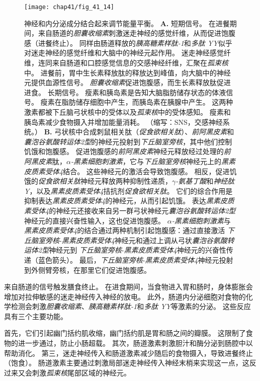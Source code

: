 \begin{figure}[htbp]
	\centering
	\texttt{[image: chap41/fig\_41\_14]}
	\caption{神经和内分泌成分结合起来调节能量平衡。 
		\textbf{A.} 短期信号。
		在进餐期间，来自肠道的\textit{胆囊收缩素}刺激迷走神经的感觉纤维，从而促进饱腹感（进餐终止）。
		同样由肠道释放的\textit{胰高糖素样肽-1}和\textit{多肽 YY}似乎对迷走神经的感觉纤维和大脑中的神经元起作用。
		迷走神经感觉纤维，连同来自肠道和口腔感觉信息的交感神经纤维，汇聚在\textit{孤束核}中。
		进餐前，胃中生长素释放肽的释放达到峰值，向大脑中的神经元提供血源性信号。
		\textit{胆囊收缩素}促进饱腹感，而生长素释放肽促进进食。
		长期信号。
		瘦素和胰岛素是告知大脑脂肪储存状态的体液信号。
		瘦素在脂肪储存细胞中产生，而胰岛素在胰腺中产生。
		这两种激素都被下丘脑弓状核中的受体以及\textit{孤束核}中的受体感知。
		瘦素和胰岛素减少食物摄入并增加能量消耗。
		（缩写：SNS，交感神经系统。）
		\textbf{B.} 弓状核中合成刺鼠相关肽（\textit{促食欲相关肽}）、\textit{前阿黑皮素}和\textit{囊泡谷氨酸转运体2型}的神经元投射到\textit{下丘脑室旁核}，其中他们控制饥饿和饱腹感。
		促进饱腹感的\textit{前阿黑皮素}神经元释放经过处理的\textit{前阿黑皮素}肽，\textit{$\alpha$-黑素细胞刺激素}，它与\textit{下丘脑室旁核}神经元上的\textit{黑素皮质素受体4}结合。
		这些神经元的激活会导致饱腹感。
		相反，促进饥饿的\textit{促食欲相关肽}神经元释放两种抑制性递质，\textit{$\gamma$-氨基丁酸}和\textit{神经肽Y}，以及\textit{黑素皮质素受体4}拮抗剂\textit{促食欲相关肽}。
		它们的综合作用是抑制表达\textit{黑素皮质素受体4}的神经元，从而引起饥饿。
		表达\textit{黑素皮质素受体4}的神经元还接收来自另一群弓状神经元\textit{囊泡谷氨酸转运体2型}神经元的直接兴奋性输入，这也促进饱腹感。
		\textit{$\alpha$-黑素细胞刺激素}与\textit{黑素皮质素受体4}的结合通过两种机制引起饱腹感：通过直接激活 \textit{下丘脑室旁核}-\textit{黑素皮质素受体4}神经元和通过上调从弓状\textit{囊泡谷氨酸转运体2型}神经元到 \textit{下丘脑室旁核}-\textit{黑素皮质素受体4}神经元的兴奋性传递（蓝色箭头）。
		最后，\textit{下丘脑室旁核}-\textit{黑素皮质素受体4}神经元投射到外侧臂旁核，在那里它们促进饱腹感。}
	\label{fig:41_14}
\end{figure}


来自肠道的信号触发膳食终止。
在进食期间，当食物进入胃和肠时，身体膨胀会增加对拉伸敏感的迷走神经传入神经的放电。
此外，肠道内分泌细胞对食物的化学检测会刺激\textit{胆囊收缩素}、\textit{胰高糖素样肽-1}和\textit{多肽 YY}等激素的分泌。
这些反应具有三个主要功能。


首先，它们引起幽门括约肌收缩，幽门括约肌是胃和肠之间的瓣膜。
这限制了食物的进一步通过，防止小肠超载。
其次，肠道激素刺激胆汁和酶分泌到肠腔中以帮助消化。
第三，迷走神经传入和肠道激素减少随后的食物摄入，导致进餐终止（饱食）。
肠道激素主要通过刺激局部迷走神经传入神经末梢来实现这一点，这反过来又会刺激\textit{孤束核}尾部区域的神经元。


